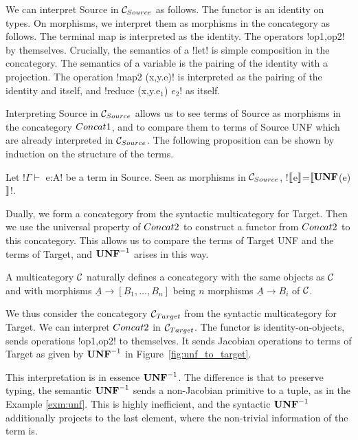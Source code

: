 We can interpret Source in $\mathcal{C}_{Source}$ as follows. The functor is an identity on types. 
On morphisms, we interpret them as morphisms in the concategory as follows.
The terminal map is interpreted as the identity. The operators !op1,op2! by themselves.
Crucially, the semantics of a !let! is simple composition in the concategory. 
The semantics of a variable is the pairing of the identity with a projection.
The operation !map2 (x,y.e)! is interpreted as the pairing of the identity and itself, and !reduce (x,y.e$_1$) $e_2$! as itself.

Interpreting Source in $\mathcal{C}_{Source}$ allows us to see terms of Source as morphisms in the concategory $Concat1$, 
and to compare them to terms of Source UNF which are already interpreted in $\mathcal{C}_{Source}$.
The following proposition can be shown by induction on the structure of the terms.

\begin{proposition}
    Let !$\Gamma \vdash$ e:A! be a term in Source. 
    Seen as morphisms in $\mathcal{C}_{Source}$, !$\llbracket$e$\rrbracket$=$\llbracket\mathbf{UNF}$(e)$\rrbracket$!.
\end{proposition}

Dually, we form a concategory from the syntactic multicategory for Target.
Then we use the universal property of $Concat2$ to construct a functor from $Concat2$ to this concategory.
This allows us to compare the terms of Target UNF and the terms of Target, and $\mathbf{UNF}^{-1}$ arises in this way.

\begin{definition}
    A multicategory $\mathcal{C}$ naturally defines a concategory with the same objects as $\mathcal{C}$ and
    with morphisms $\underline{A}\to [B_1,\ldots,B_n]$ being $n$ morphisms $\underline{A}\to B_i$ of $\mathcal{C}$. 
\end{definition}

We thus consider the concategory $\mathcal{C}_{Target}$ from the syntactic multicategory for Target.
We can interpret $Concat2$ in $\mathcal{C}_{Target}$. 
The functor is identity-on-objects, sends operations !op1,op2! to themselves. 
It sends Jacobian operations to terms of Target as given by $\mathbf{UNF}^{-1}$ in Figure~\ref{fig:unf_to_target}.

This interpretation is in essence $\mathbf{UNF}^{-1}$. 
The difference is that to preserve typing, the semantic $\mathbf{UNF}^{-1}$
sends a non-Jacobian primitive to a tuple, as in the Example \ref{exm:unf}. 
This is highly inefficient, and the syntactic $\mathbf{UNF}^{-1}$ 
additionally projects to the last element, where the non-trivial information of the term is.

